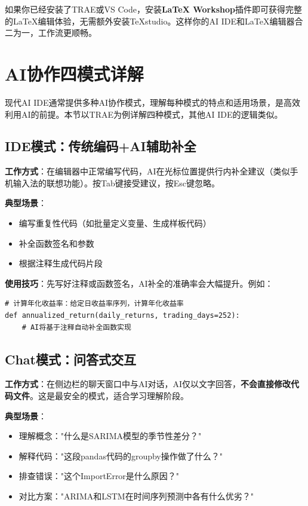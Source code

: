 \begin{practicebox}[推荐方案]
如果你已经安装了TRAE或VS Code，安装\textbf{LaTeX Workshop}插件即可获得完整的LaTeX编辑体验，无需额外安装TeXstudio。这样你的AI IDE和LaTeX编辑器合二为一，工作流更顺畅。
\end{practicebox}

\section{AI协作四模式详解}

现代AI IDE通常提供多种AI协作模式，理解每种模式的特点和适用场景，是高效利用AI的前提。本节以TRAE为例详解四种模式，其他AI IDE的逻辑类似。

\subsection{IDE模式：传统编码+AI辅助补全}

\textbf{工作方式}：在编辑器中正常编写代码，AI在光标位置提供行内补全建议（类似手机输入法的联想功能）。按Tab键接受建议，按Esc键忽略。

\textbf{典型场景}：
\begin{itemize}[leftmargin=2em]
  \item 编写重复性代码（如批量定义变量、生成样板代码）
  \item 补全函数签名和参数
  \item 根据注释生成代码片段
\end{itemize}

\textbf{使用技巧}：先写好注释或函数签名，AI补全的准确率会大幅提升。例如：

\begin{lstlisting}[style=python]
# 计算年化收益率：给定日收益率序列，计算年化收益率
def annualized_return(daily_returns, trading_days=252):
    # AI将基于注释自动补全函数实现
\end{lstlisting}

\subsection{Chat模式：问答式交互}

\textbf{工作方式}：在侧边栏的聊天窗口中与AI对话，AI仅以文字回答，\textbf{不会直接修改代码文件}。这是最安全的模式，适合学习理解阶段。

\textbf{典型场景}：
\begin{itemize}[leftmargin=2em]
  \item 理解概念："什么是SARIMA模型的季节性差分？"
  \item 解释代码："这段pandas代码的groupby操作做了什么？"
  \item 排查错误："这个ImportError是什么原因？"
  \item 对比方案："ARIMA和LSTM在时间序列预测中各有什么优劣？"
\end{itemize}

